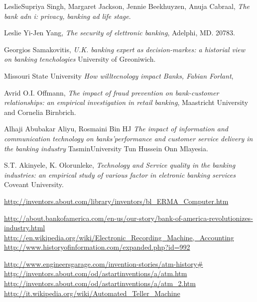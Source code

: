 \documentclass[aip, reprint]{article}
\begin{document}
\newpage
\begin{thebibliography}{9}

	LeslieSupriya Singh, Margaret Jackson, Jennie Beekhuyzen, Anuja Cabraal,
	\emph{The bank adn i: privacy, banking ad life stage}.

	Leslie Yi-Jen Yang,
	\emph{The security of elettronic banking},
	Adelphi, MD. 20783.

	Georgios Samakovitis,
	\emph{U.K. banking expert as decision-markes: a historial view on banking tenchologies}
	University of Greoniwich.

	Missouri State University
	\emph{How willtecnology impact Banks, Fabian Forlant},
	

	Avrid O.I. Offmann, 
	\emph{The impact of fraud prevention on bank-customer relationships: an empirical investigation in retail banking},
	Maastricht University and Cornelia Birnbrich.


	Alhaji Abubakar Aliyu, Rosmaini Bin HJ 
	\emph{The impact of information and communication technology on banks’performance and customer service delivery in the banking industry}
	TasminUniversity Tun Hussein Onn Mlayesia.

	S.T. Akinyele, K. Olorunleke,
	\emph{Technology and Service quality in the banking industries: an empirical study of various factor in eletronic banking services}
	Coveant University.

	\url{http://inventors.about.com/library/inventors/bl_ERMA_Computer.htm}

	\url{http://about.bankofamerica.com/en-us/our-story/bank-of-america-revolutionizes-industry.html}
	\url{http://en.wikipedia.org/wiki/Electronic_Recording_Machine,_Accounting}
	\url{http://www.historyofinformation.com/expanded.php?id=992}

	\url{http://www.engineersgarage.com/invention-stories/atm-history#}
	\url{http://inventors.about.com/od/astartinventions/a/atm.htm}
	\url{http://inventors.about.com/od/astartinventions/a/atm_2.htm}
	\url{http://it.wikipedia.org/wiki/Automated_Teller_Machine}



\end{thebibliography}
\end{document}

